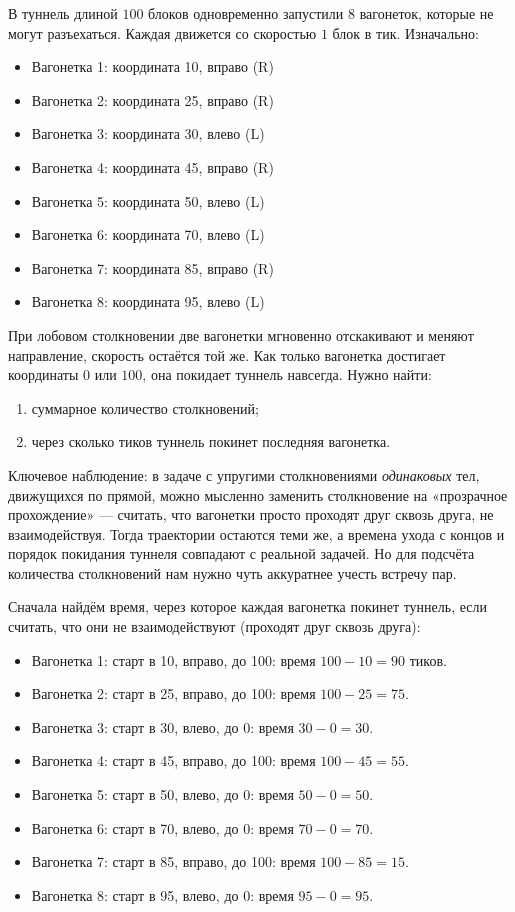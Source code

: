 \documentclass[12pt,a4paper]{article}
\begin{document}
В туннель длиной $100$ блоков одновременно запустили $8$ вагонеток, которые не могут разъехаться. Каждая движется со скоростью $1$ блок в тик. Изначально:
\begin{itemize}
  \item Вагонетка 1: координата 10, вправо (R)
  \item Вагонетка 2: координата 25, вправо (R)
  \item Вагонетка 3: координата 30, влево (L)
  \item Вагонетка 4: координата 45, вправо (R)
  \item Вагонетка 5: координата 50, влево (L)
  \item Вагонетка 6: координата 70, влево (L)
  \item Вагонетка 7: координата 85, вправо (R)
  \item Вагонетка 8: координата 95, влево (L)
\end{itemize}
При лобовом столкновении две вагонетки мгновенно отскакивают и меняют направление, скорость остаётся той же. Как только вагонетка достигает координаты $0$ или $100$, она покидает туннель навсегда. Нужно найти:
\begin{enumerate}
  \item суммарное количество столкновений;
  \item через сколько тиков туннель покинет последняя вагонетка.
\end{enumerate}

Ключевое наблюдение: в задаче с упругими столкновениями \emph{одинаковых} тел, движущихся по прямой, можно мысленно заменить столкновение на «прозрачное прохождение» --- считать, что вагонетки просто проходят друг сквозь друга, не взаимодействуя. Тогда траектории остаются теми же, а времена ухода с концов и порядок покидания туннеля совпадают с реальной задачей. Но для подсчёта количества столкновений нам нужно чуть аккуратнее учесть встречу пар.

Сначала найдём время, через которое каждая вагонетка покинет туннель, если считать, что они не взаимодействуют (проходят друг сквозь друга):
\begin{itemize}
  \item Вагонетка 1: старт в 10, вправо, до 100: время $100 - 10 = 90$ тиков.
  \item Вагонетка 2: старт в 25, вправо, до 100: время $100 - 25 = 75$.
  \item Вагонетка 3: старт в 30, влево, до 0: время $30 - 0 = 30$.
  \item Вагонетка 4: старт в 45, вправо, до 100: время $100 - 45 = 55$.
  \item Вагонетка 5: старт в 50, влево, до 0: время $50 - 0 = 50$.
  \item Вагонетка 6: старт в 70, влево, до 0: время $70 - 0 = 70$.
  \item Вагонетка 7: старт в 85, вправо, до 100: время $100 - 85 = 15$.
  \item Вагонетка 8: старт в 95, влево, до 0: время $95 - 0 = 95$.
\end{itemize}
\end{document}
